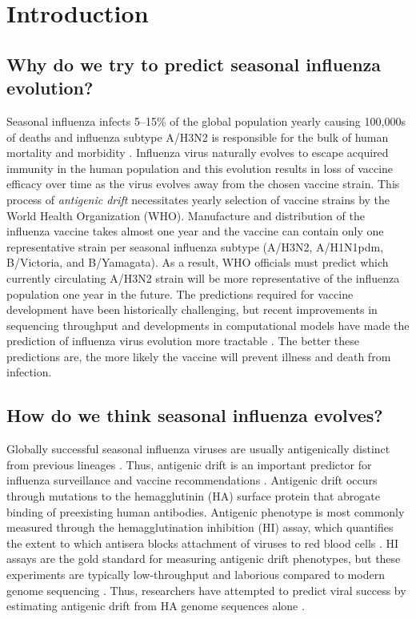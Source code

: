 \chapter {Introduction}

\section{Why do we try to predict seasonal influenza evolution?}

Seasonal influenza infects 5--15\% of the global population yearly causing 100,000s of deaths and influenza subtype A/H3N2 is responsible for the bulk of human mortality and morbidity \citep{WHO2009}.
Influenza virus naturally evolves to escape acquired immunity in the human population and this evolution results in loss of vaccine efficacy over time as the virus evolves away from the chosen vaccine strain.
This process of \textit{antigenic drift} necessitates yearly selection of vaccine strains by the World Health Organization (WHO).
Manufacture and distribution of the influenza vaccine takes almost one year and the vaccine can contain only one representative strain per seasonal influenza subtype (A/H3N2, A/H1N1pdm, B/Victoria, and B/Yamagata).
As a result, WHO officials must predict which currently circulating A/H3N2 strain will be more representative of the influenza population one year in the future.
The predictions required for vaccine development have been historically challenging, but recent improvements in sequencing throughput and developments in computational models have made the prediction of influenza virus evolution more tractable \citep{Lassig:2017hr,Morris:2017ea}.
The better these predictions are, the more likely the vaccine will prevent illness and death from infection.

\section{How do we think seasonal influenza evolves?}

Globally successful seasonal influenza viruses are usually antigenically distinct from previous lineages \citep{Smith:2004jc}.
Thus, antigenic drift is an important predictor for influenza surveillance and vaccine recommendations \citep{Morris:2017ea}.
Antigenic drift occurs through mutations to the hemagglutinin (HA) surface protein that abrogate binding of preexisting human antibodies.
Antigenic phenotype is most commonly measured through the hemagglutination inhibition (HI) assay, which quantifies the extent to which antisera blocks attachment of viruses to red blood cells \citep{hirst1943studies}.
HI assays are the gold standard for measuring antigenic drift phenotypes, but these experiments are typically low-throughput and laborious compared to modern genome sequencing \citep{Wood:2012ii}.
Thus, researchers have attempted to predict viral success by estimating antigenic drift from HA genome sequences alone \citep{Luksza:2014hj,Steinbruck:2014kq,Neher:2014eu}.


